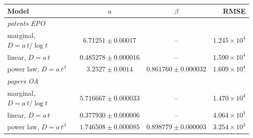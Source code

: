 \begin{tabular}{lccr}
\toprule
Model & $a$ & $\beta$ & RMSE \\
\midrule
\multicolumn{4}{l}{\textit{patents EPO}} \\
marginal, $D=a\,t/\log t$ & $6.71251 \pm 0.00017$ & -- & $1.245\times 10^{4}$ \\
linear, $D=a\,t$ & $0.485278 \pm 0.000016$ & -- & $1.590\times 10^{4}$ \\
power law, $D=a\,t^{\beta}$ & $3.2527 \pm 0.0014$ & $0.861760 \pm 0.000032$ & $1.609\times 10^{4}$ \\
\midrule
\multicolumn{4}{l}{\textit{papers OA}} \\
marginal, $D=a\,t/\log t$ & $5.716667 \pm 0.000033$ & -- & $1.470\times 10^{4}$ \\
linear, $D=a\,t$ & $0.377930 \pm 0.000006$ & -- & $4.064\times 10^{4}$ \\
power law, $D=a\,t^{\beta}$ & $1.746508 \pm 0.000085$ & $0.898779 \pm 0.000003$ & $3.254\times 10^{3}$ \\
\bottomrule
\end{tabular}
